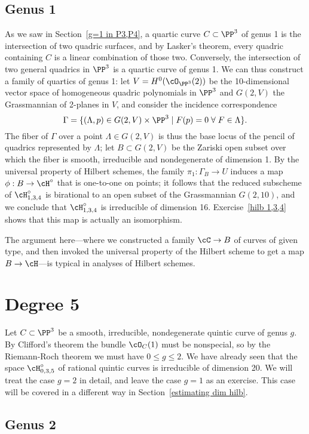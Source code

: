 \subsection{Genus 1}
 As we saw in Section~\ref{g=1 in P3,P4}, a quartic curve $C \subset \PP^3$ of genus 1 is the intersection of two quadric surfaces, and by Lasker's theorem, every quadric containing $C$ is a linear combination of those two. Conversely, the intersection of two general quadrics in $\PP^3$ is a quartic curve of genus 1. We can thus construct a family of quartics of genus 1: let $V = H^0(\cO_{\PP^3}(2))$ be the 10-dimensional vector space of homogeneous quadric polynomials in $\PP^3$ and $G(2,V)$ the Grassmannian of 2-planes in $V$, and consider the incidence correspondence
$$
\Gamma = \{ (\Lambda, p) \in G(2,V) \times \PP^3 \mid F(p)=0 \; \forall \; F \in \Lambda \}.
$$
The fiber of $\Gamma$ over a point $\Lambda \in G(2,V)$ is thus the base locus of the pencil of quadrics represented by $\Lambda$; let $B \subset G(2,V)$ be the Zariski open subset over which the fiber is smooth, irreducible and nondegenerate of dimension 1. By the universal property of Hilbert schemes, the family $\pi_1 : \Gamma_B \to U$ induces a map $\phi : B \to \cH^\circ$ that is one-to-one on points; it follows that the reduced subscheme of $\cH^\circ_{1,3,4}$ is birational to an open subset of the Grassmannian $G(2,10)$, and we conclude that $\cH^\circ_{1,3,4}$ is irreducible of dimension 16. Exercise~\ref{hilb 1,3,4} shows that this map is actually an isomorphism.

The  argument  here---where we constructed a family $\cC \to B$ of curves of given type, and then invoked the universal property of the Hilbert scheme to get a map $B \to \cH$---is typical in analyses of Hilbert schemes. 

\section{Degree 5}

Let $C \subset \PP^3$ be a smooth, irreducible, nondegenerate quintic curve of genus $g$. By Clifford's theorem the bundle $\cO_C(1)$ must be nonspecial, so  by the Riemann-Roch theorem we must have $0\leq g \leq 2$. We have already seen that the space $\cH^\circ_{0,3,5}$ of rational quintic curves is irreducible of dimension 20. We will treat the case $g=2$ in detail, and leave the case $g=1$ as an exercise. This case will be covered in a different way in Section~\ref{estimating dim hilb}.

\subsection{Genus 2}

